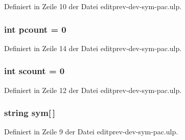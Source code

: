 Definiert in Zeile 10 der Datei editprev-\/dev-\/sym-\/pac.\+ulp.

\hypertarget{editprev-dev-sym-pac_8ulp_a747fe457bac32c34b78b69f9bfefd6f3}{}
\subsubsection[{pcount}]{\setlength{\rightskip}{0pt plus 5cm}int pcount = 0}\label{editprev-dev-sym-pac_8ulp_a747fe457bac32c34b78b69f9bfefd6f3}


Definiert in Zeile 14 der Datei editprev-\/dev-\/sym-\/pac.\+ulp.

\hypertarget{editprev-dev-sym-pac_8ulp_a7ad37c8d993b00d12609dd9ae98ec650}{}
\subsubsection[{scount}]{\setlength{\rightskip}{0pt plus 5cm}int scount = 0}\label{editprev-dev-sym-pac_8ulp_a7ad37c8d993b00d12609dd9ae98ec650}


Definiert in Zeile 12 der Datei editprev-\/dev-\/sym-\/pac.\+ulp.

\hypertarget{editprev-dev-sym-pac_8ulp_a618376f21731b07801ed522f58f270ed}{}
\subsubsection[{sym}]{\setlength{\rightskip}{0pt plus 5cm}string sym\mbox{[}$\,$\mbox{]}}\label{editprev-dev-sym-pac_8ulp_a618376f21731b07801ed522f58f270ed}


Definiert in Zeile 9 der Datei editprev-\/dev-\/sym-\/pac.\+ulp.

